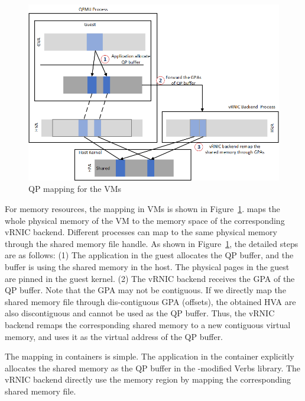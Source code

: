\begin{figure}[!ht]
	\centering
	\includegraphics[width=1\linewidth]{images/qp-map.png}
	\caption{QP mapping for the VMs}
	\label{fig:qp-map}
\end{figure}

For memory resources, the mapping in VMs is shown in Figure~\ref{fig:qp-map}. \sys maps the whole physical memory of the VM to the memory space of the corresponding vRNIC backend. Different processes can map to the same physical memory through the shared memory file handle. As shown in Figure~\ref{fig:qp-map}, the detailed steps are as follows: (1) The application in the guest allocates the QP buffer, and the buffer is using the shared memory in the host. The physical pages in the guest are pinned in the guest kernel. (2) The vRNIC backend receives the GPA of the QP buffer. Note that the GPA may not be contiguous. If we directly map the shared memory file through dis-contiguous GPA (offsets), the obtained HVA are also discontiguous and cannot be used as the QP buffer. Thus, the vRNIC backend remaps the corresponding shared memory to a new contiguous virtual memory, and uses it as the virtual address of the QP buffer.



The mapping in containers is simple. The application in the container explicitly allocates the shared memory as the QP buffer in the \sys-modified Verbs library. The vRNIC backend directly use the memory region by mapping the corresponding shared memory file.


